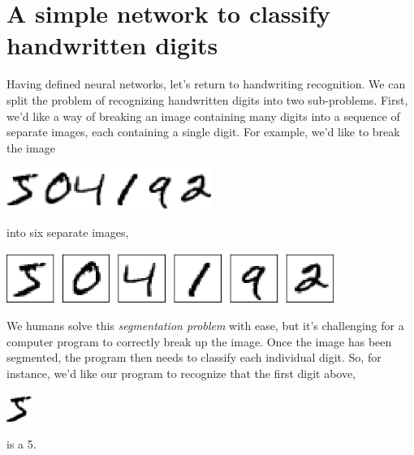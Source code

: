 \section{A simple network to classify handwritten digits}

Having defined neural networks, let's return to handwriting recognition. We can split the problem of recognizing handwritten digits into two sub-problems. First, we'd like a way of breaking an image containing many digits into a sequence of separate images, each containing a single digit. For example, we'd like to break the image


{\centering
\includegraphics[width=0.5\textwidth,]{pic/504192}
\par}

into six separate images,

{\centering
\includegraphics[width=0.8\textwidth,]{pic/digits_separate}
\par}

We humans solve this \textit{segmentation problem} with ease, but it's challenging for a computer program to correctly break up the image. Once the image has been segmented, the program then needs to classify each individual digit. So, for instance, we'd like our program to recognize that the first digit above,


{\centering
\includegraphics[width=.2\textwidth,]{pic/mnist_first_digit}
\par}

is a 5.

